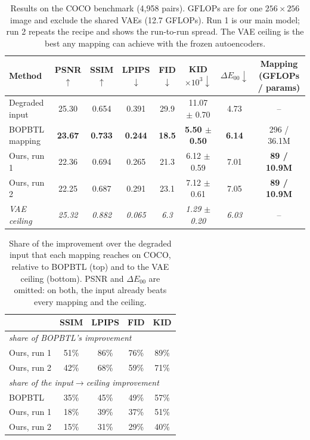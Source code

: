 \documentclass[10pt,twocolumn,letterpaper]{article}
\begin{document}
\begin{table}[t]
\centering
\small
\caption{Results on the COCO benchmark (4{,}958 pairs). GFLOPs are for one $256{\times}256$ image and exclude the shared
VAEs (12.7 GFLOPs). Run 1 is our main model; run 2 repeats the recipe and shows the run-to-run spread. The VAE ceiling is
the best any mapping can achieve with the frozen autoencoders.}
\label{tab:main}
\begin{tabular}{lccccccc}
\toprule
Method & PSNR$\uparrow$ & SSIM$\uparrow$ & LPIPS$\downarrow$ & FID$\downarrow$ & KID$\times10^3\downarrow$ &
$\Delta E_{00}\downarrow$ & Mapping (GFLOPs / params) \\
\midrule
Degraded input & 25.30 & 0.654 & 0.391 & 29.9 & 11.07 $\pm$ 0.70 & 4.73 & -- \\
BOPBTL mapping~\cite{wan2020bringing} & \textbf{23.67} & \textbf{0.733} & \textbf{0.244} & \textbf{18.5} &
\textbf{5.50 $\pm$ 0.50} & \textbf{6.14} & 296 / 36.1M \\
Ours, run 1 & 22.36 & 0.694 & 0.265 & 21.3 & 6.12 $\pm$ 0.59 & 7.01 & \textbf{89 / 10.9M} \\
Ours, run 2 & 22.25 & 0.687 & 0.291 & 23.1 & 7.12 $\pm$ 0.61 & 7.05 & \textbf{89 / 10.9M} \\
\midrule
\textit{VAE ceiling} & \textit{25.32} & \textit{0.882} & \textit{0.065} & \textit{6.3} & \textit{1.29 $\pm$ 0.20} &
\textit{6.03} & -- \\
\bottomrule
\end{tabular}
\end{table}

\begin{table}[t]
\centering
\small
\caption{Share of the improvement over the degraded input that each mapping reaches on COCO, relative to BOPBTL
(top) and to the VAE ceiling (bottom). PSNR and $\Delta E_{00}$ are omitted: on both, the input already beats every
mapping and the ceiling.}
\label{tab:share}
\begin{tabular}{lcccc}
\toprule
 & SSIM & LPIPS & FID & KID \\
\midrule
\multicolumn{5}{l}{\emph{share of BOPBTL's improvement}} \\
Ours, run 1 & 51\% & 86\% & 76\% & 89\% \\
Ours, run 2 & 42\% & 68\% & 59\% & 71\% \\
\midrule
\multicolumn{5}{l}{\emph{share of the input$\to$ceiling improvement}} \\
BOPBTL & 35\% & 45\% & 49\% & 57\% \\
Ours, run 1 & 18\% & 39\% & 37\% & 51\% \\
Ours, run 2 & 15\% & 31\% & 29\% & 40\% \\
\bottomrule
\end{tabular}
\end{table}
\end{document}
